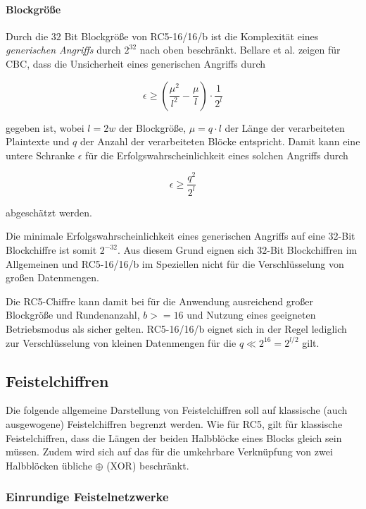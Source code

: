 \documentclass[course=erap]{aspdoc}
\begin{document}
\paragraph{Blockgröße} Durch die $32$ Bit Blockgröße von RC5-16/16/b ist die Komplexität eines \textit{generischen Angriffs} durch $2^{32}$ nach oben beschränkt. Bellare et al. zeigen für CBC, dass die Unsicherheit eines generischen Angriffs durch

\[
    \epsilon \geq \left(\frac{\mu^2}{l^2} - \frac{\mu}{l}\right) \cdot \frac{1}{2^l}
\]

gegeben ist, wobei $l = 2w$ der Blockgröße, $\mu = q \cdot l$ der Länge der verarbeiteten Plaintexte und $q$ der Anzahl der verarbeiteten Blöcke entspricht.\cite[p.5; p.24]{bellare} Damit kann eine untere Schranke $\epsilon$ für die Erfolgswahrscheinlichkeit eines solchen Angriffs durch

\[
    \epsilon \geq \frac{q^2}{2^l}
\]

abgeschätzt werden.\bigbreak

Die minimale Erfolgswahrscheinlichkeit eines generischen Angriffs auf eine 32-Bit Blockchiffre ist somit $2^{-32}$. Aus diesem Grund eignen sich $32$-Bit Blockchiffren im Allgemeinen und RC5-16/16/b im Speziellen nicht für die Verschlüsselung von großen Datenmengen.\bigbreak

Die RC5-Chiffre kann damit bei für die Anwendung ausreichend großer Blockgröße und Rundenanzahl, $b >= 16$ und Nutzung eines geeigneten Betriebsmodus als sicher gelten. RC5-16/16/b eignet sich in der Regel lediglich zur Verschlüsselung von kleinen Datenmengen für die $q \ll 2^{16} = 2^{l/2}$ gilt.

\subsection{Feistelchiffren}

Die folgende allgemeine Darstellung von Feistelchiffren soll auf klassische (auch ausgewogene) Feistelchiffren begrenzt werden. Wie für RC5, gilt für klassische Feistelchiffren, dass die Längen der beiden Halbblöcke eines Blocks gleich sein müssen. Zudem wird sich auf das für die umkehrbare Verknüpfung von zwei Halbblöcken übliche $\oplus$ (XOR) beschränkt.

\subsubsection{Einrundige Feistelnetzwerke}
\end{document}
